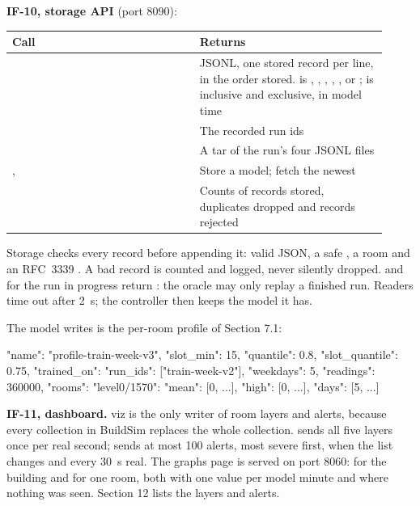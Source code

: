 \textbf{IF-10, storage API} (port 8090):

\begin{longtable}[]{@{}L{0.46\linewidth}L{0.46\linewidth}@{}}
\toprule
\textbf{Call} & \textbf{Returns} \\
\midrule
\endhead
{} & JSONL, one stored record per line, in the order stored.  is , , , , ,  or ;  is inclusive and  exclusive, in model time \\
 & The recorded run ids \\
 & A tar of the run's four JSONL files \\
,  & Store a model; fetch the newest \\
 & Counts of records stored, duplicates dropped and records rejected \\
\bottomrule
\end{longtable}

Storage checks every record before appending it: valid JSON, a safe
, a room and an RFC~3339 . A bad record is
counted and logged, never silently dropped.  and
 for the run in progress return : the
oracle may only replay a finished run. Readers time out after 2~s; the
controller then keeps the model it has.

The model  writes is the per-room profile of Section 7.1:

\begin{json}
{"name": "profile-train-week-v3", "slot_min": 15, "quantile": 0.8,
 "slot_quantile": 0.75,
 "trained_on": {"run_ids": ["train-week-v2"], "weekdays": 5, "readings": 360000},
 "rooms": {"level0/1570": {"mean": [0, ...], "high": [0, ...], "days": [5, ...]}}}
\end{json}

\textbf{IF-11, dashboard.} viz is the only writer of room layers and alerts,
because every collection  in BuildSim replaces the whole collection.
 sends all five layers once per real second;
 sends at most 100 alerts, most severe first, when the
list changes and every 30~s real. The graphs page is served on port 8060:
 for the building and
 for one room, both with one value
per model minute and  where nothing was seen. Section 12 lists the
layers and alerts.

